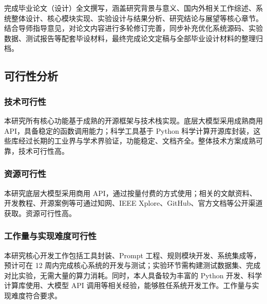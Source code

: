 完成毕业论文（设计）全文撰写，涵盖研究背景与意义、国内外相关工作综述、系统整体设计、核心模块实现、实验设计与结果分析、研究结论与展望等核心章节。结合导师指导意见，对论文内容进行多轮修订完善，同步补充优化系统源码、实验数据、测试报告等配套毕设材料，最终完成论文定稿与全部毕业设计材料的整理归档。

\subsection{可行性分析}

\subsubsection{技术可行性}

本研究所有核心功能基于成熟的开源框架与技术栈实现。底层大模型采用成熟商用 API，具备稳定的函数调用能力\cite{openai2023gpt4}；科学工具基于 Python 科学计算开源库封装\cite{harris2020numpy,virtanen2020scipy,mckinney2010pandas}，这些库经过长期的工业界与学术界验证，功能稳定、文档齐全。整体技术方案成熟可靠，技术可行性高。

\subsubsection{资源可行性}

本研究底层大模型采用商用 API，通过按量付费的方式使用；相关的文献资料、开发教程、开源案例等可通过知网、IEEE Xplore、GitHub、官方文档等公开渠道获取\cite{langchain2023,llamaindex2023}。资源可行性高。

\subsubsection{工作量与实现难度可行性}

本研究核心开发工作包括工具封装、Prompt 工程、规则模块开发、系统集成等，预计可在 12 周内完成核心系统的开发与测试；实验环节需构建测试数据集、完成对比实验，无需大量的算力消耗。同时，本人具备较为丰富的 Python 开发、科学计算库使用、大模型 API 调用等相关经验，能够胜任系统开发工作。工作量与实现难度符合要求。
